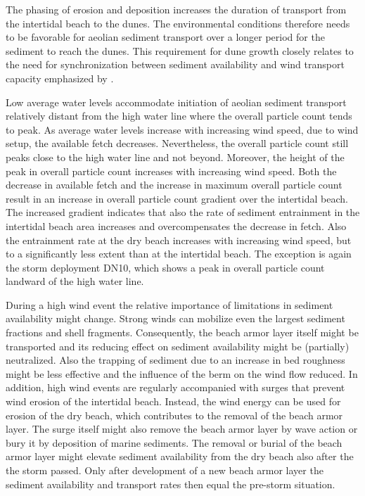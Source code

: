 The phasing of erosion and deposition increases the duration of
transport from the intertidal beach to the dunes. The environmental
conditions therefore needs to be favorable for aeolian sediment
transport over a longer period for the sediment to reach the
dunes. This requirement for dune growth closely relates to the need
for synchronization between sediment availability and wind transport
capacity emphasized by \citet{Houser2009}.

Low average water levels accommodate initiation of aeolian sediment
transport relatively distant from the high water line where the
overall particle count tends to peak. As average water levels increase
with increasing wind speed, due to wind setup, the available fetch
decreases. Nevertheless, the overall particle count still peaks close
to the high water line and not beyond. Moreover, the height of the
peak in overall particle count increases with increasing wind
speed. Both the decrease in available fetch and the increase in
maximum overall particle count result in an increase in overall
particle count gradient over the intertidal beach.  The increased
gradient indicates that also the rate of sediment entrainment in the
intertidal beach area increases and overcompensates the decrease in
fetch. Also the entrainment rate at the dry beach increases with
increasing wind speed, but to a significantly less extent than at the
intertidal beach. The exception is again the storm deployment DN10,
which shows a peak in overall particle count landward of the high
water line.


During a high wind event the relative importance of limitations in
sediment availability might change. Strong winds can mobilize even the
largest sediment fractions and shell fragments. Consequently, the
beach armor layer itself might be transported and its reducing effect
on sediment availability might be (partially) neutralized. Also the
trapping of sediment due to an increase in bed roughness might be less
effective and the influence of the berm on the wind flow reduced. In
addition, high wind events are regularly accompanied with surges that
prevent wind erosion of the intertidal beach. Instead, the wind energy
can be used for erosion of the dry beach, which contributes to the
removal of the beach armor layer. The surge itself might also remove
the beach armor layer by wave action or bury it by deposition of
marine sediments. The removal or burial of the beach armor layer might
elevate sediment availability from the dry beach also after the the
storm passed. Only after development of a new beach armor layer the
sediment availability and transport rates then equal the pre-storm
situation.

